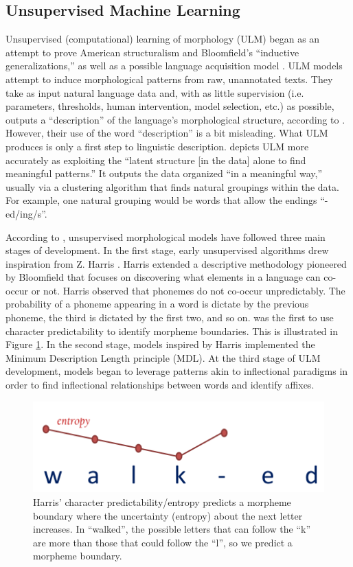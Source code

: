 \documentclass[12pt]{article}
\begin{document}
\subsection{Unsupervised Machine Learning}

Unsupervised (computational) learning of morphology (ULM) began as an attempt to prove American structuralism and Bloomfield's ``inductive generalizations,'' as well as a possible language acquisition model \cite{hammarstrom_unsupervised_2011}. ULM models attempt to induce morphological patterns from raw, unannotated texts. They take as input natural language data and, with as little supervision (i.e. parameters, thresholds, human intervention, model selection, etc.) as possible, outputs a ``description'' of the language’s morphological structure, according to . However, their use of the word “description” is a bit misleading. What ULM produces is only a first step to linguistic description.  depicts ULM more accurately as exploiting the ``latent structure [in the data] alone to find meaningful patterns.'' It outputs the data organized ``in a meaningful way,'' usually via a clustering algorithm that finds natural groupings within the data. For example, one natural grouping would be words that allow the endings ``-ed/ing/s''.

According to , unsupervised morphological models have followed three main stages of development. In the first stage, early unsupervised algorithms drew inspiration from Z. Harris \cite{harris_phoneme_1955,harris_morpheme_1967}. Harris extended a descriptive methodology pioneered by Bloomfield that focuses on discovering what elements in a language can co-occur or not. Harris observed that phonemes do not co-occur unpredictably. The probability of a phoneme appearing in a word is dictate by the previous phoneme, the third is dictated by the first two, and so on.  was the first to use character predictability to identify morpheme boundaries. This is illustrated in Figure \ref{fig:harris}. In the second stage, models inspired by Harris implemented the Minimum Description Length principle (MDL). At the third stage of ULM development, models began to leverage patterns akin to inflectional paradigms in order to find inflectional relationships between words and identify affixes.

\begin{figure}[h]
\begin{center}
\includegraphics[width=0.5\columnwidth]{Harris-Entropy-image.PNG}
\caption{Harris' character predictability/entropy predicts a morpheme boundary where the uncertainty (entropy) about the next letter increases. In ``walked'', the possible letters that can follow the ``k'' are more than those that could follow the ``l'', so we predict a morpheme boundary.}
\label{fig:harris}
\end{center}
\end{figure}
\end{document}
